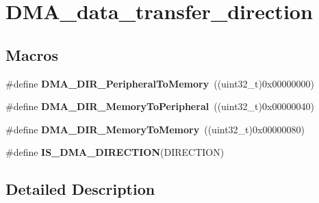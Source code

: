 \hypertarget{group___d_m_a__data__transfer__direction}{\section{D\-M\-A\-\_\-data\-\_\-transfer\-\_\-direction}
\label{group___d_m_a__data__transfer__direction}
}
\subsection*{Macros}
\begin{DoxyCompactItemize}
\item 
\hypertarget{group___d_m_a__data__transfer__direction_ga4d7847b57371eef92ec5da34511416a7}{\#define {\bfseries D\-M\-A\-\_\-\-D\-I\-R\-\_\-\-Peripheral\-To\-Memory}~((uint32\-\_\-t)0x00000000)}\label{group___d_m_a__data__transfer__direction_ga4d7847b57371eef92ec5da34511416a7}

\item 
\hypertarget{group___d_m_a__data__transfer__direction_gae1e6aa2722beb09b5be7140205244986}{\#define {\bfseries D\-M\-A\-\_\-\-D\-I\-R\-\_\-\-Memory\-To\-Peripheral}~((uint32\-\_\-t)0x00000040)}\label{group___d_m_a__data__transfer__direction_gae1e6aa2722beb09b5be7140205244986}

\item 
\hypertarget{group___d_m_a__data__transfer__direction_gafb7d5b786f2fb56a903936cdc6d5e89a}{\#define {\bfseries D\-M\-A\-\_\-\-D\-I\-R\-\_\-\-Memory\-To\-Memory}~((uint32\-\_\-t)0x00000080)}\label{group___d_m_a__data__transfer__direction_gafb7d5b786f2fb56a903936cdc6d5e89a}

\item 
\#define {\bfseries I\-S\-\_\-\-D\-M\-A\-\_\-\-D\-I\-R\-E\-C\-T\-I\-O\-N}(D\-I\-R\-E\-C\-T\-I\-O\-N)
\end{DoxyCompactItemize}


\subsection{Detailed Description}


